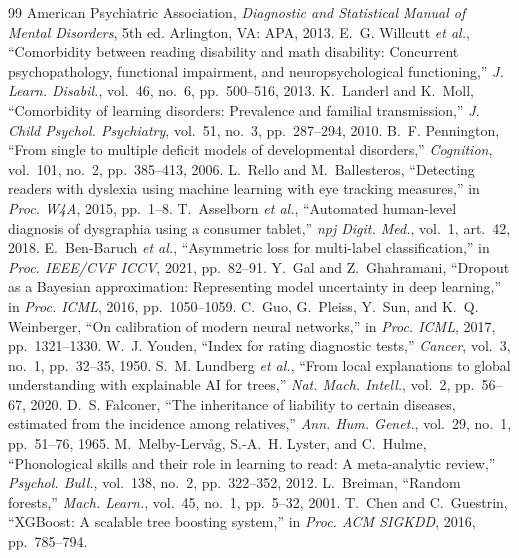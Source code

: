 \documentclass[conference]{IEEEtran}
\begin{document}
\begin{thebibliography}{99}
 American Psychiatric Association, \emph{Diagnostic and Statistical Manual of Mental Disorders}, 5th ed. Arlington, VA: APA, 2013.
 E.~G. Willcutt \emph{et al.}, ``Comorbidity between reading disability and math disability: Concurrent psychopathology, functional impairment, and neuropsychological functioning,'' \emph{J. Learn. Disabil.}, vol.~46, no.~6, pp.~500--516, 2013.
 K.~Landerl and K.~Moll, ``Comorbidity of learning disorders: Prevalence and familial transmission,'' \emph{J. Child Psychol. Psychiatry}, vol.~51, no.~3, pp.~287--294, 2010.
 B.~F. Pennington, ``From single to multiple deficit models of developmental disorders,'' \emph{Cognition}, vol.~101, no.~2, pp.~385--413, 2006.
 L.~Rello and M.~Ballesteros, ``Detecting readers with dyslexia using machine learning with eye tracking measures,'' in \emph{Proc. W4A}, 2015, pp.~1--8.
 T.~Asselborn \emph{et al.}, ``Automated human-level diagnosis of dysgraphia using a consumer tablet,'' \emph{npj Digit. Med.}, vol.~1, art.~42, 2018.
 E.~Ben-Baruch \emph{et al.}, ``Asymmetric loss for multi-label classification,'' in \emph{Proc. IEEE/CVF ICCV}, 2021, pp.~82--91.
 Y.~Gal and Z.~Ghahramani, ``Dropout as a Bayesian approximation: Representing model uncertainty in deep learning,'' in \emph{Proc. ICML}, 2016, pp.~1050--1059.
 C.~Guo, G.~Pleiss, Y.~Sun, and K.~Q. Weinberger, ``On calibration of modern neural networks,'' in \emph{Proc. ICML}, 2017, pp.~1321--1330.
 W.~J. Youden, ``Index for rating diagnostic tests,'' \emph{Cancer}, vol.~3, no.~1, pp.~32--35, 1950.
 S.~M. Lundberg \emph{et al.}, ``From local explanations to global understanding with explainable AI for trees,'' \emph{Nat. Mach. Intell.}, vol.~2, pp.~56--67, 2020.
 D.~S. Falconer, ``The inheritance of liability to certain diseases, estimated from the incidence among relatives,'' \emph{Ann. Hum. Genet.}, vol.~29, no.~1, pp.~51--76, 1965.
 M.~Melby-Lerv{\aa}g, S.-A.~H. Lyster, and C.~Hulme, ``Phonological skills and their role in learning to read: A meta-analytic review,'' \emph{Psychol. Bull.}, vol.~138, no.~2, pp.~322--352, 2012.
 L.~Breiman, ``Random forests,'' \emph{Mach. Learn.}, vol.~45, no.~1, pp.~5--32, 2001.
 T.~Chen and C.~Guestrin, ``XGBoost: A scalable tree boosting system,'' in \emph{Proc. ACM SIGKDD}, 2016, pp.~785--794.

\end{thebibliography}
\end{document}
